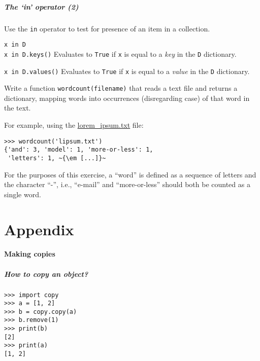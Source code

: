 \documentclass[english,serif,mathserif,xcolor=pdftex,dvipsnames,table]{beamer}
\begin{document}
\begin{frame}[fragile]
  \frametitle{The `{\ttfamily\bfseries in}' operator (2)}

  Use the \lstinline|in| operator to test for presence of an item in a
  collection.

  \begin{describe}{\lstinline|x in D| \\ \lstinline|x in D.keys()|}
    Evaluates to \texttt{True} if \lstinline|x| is equal to a \emph{key}
    in the \lstinline|D| dictionary.
  \end{describe}

  \begin{describe}{\lstinline|x in D.values()|}
    Evaluates to \texttt{True} if \lstinline|x| is equal to a \emph{value}
    in the \lstinline|D| dictionary.
  \end{describe}

\end{frame}


\begin{frame}[fragile]
\begin{exercise*}[6.A]
    Write a function \lstinline|wordcount(filename)| that reads a text
    file and returns a dictionary, mapping words into occurrences
    (disregarding case) of that word in the text.

    \+ For example, using the
    \href{https://raw.github.com/gc3-uzh-ch/python-course/master/lorem_ipsum.txt}{lorem\_ipsum.txt}
    file:
    \begin{lstlisting}
>>> wordcount('lipsum.txt')
{'and': 3, 'model': 1, 'more-or-less': 1,
 'letters': 1, ~{\em [...]}~
    \end{lstlisting}

    \+ For the purposes of this
    exercise, a ``word'' is defined as a sequence of letters and the
    character ``-'', i.e., ``e-mail'' and ``more-or-less'' should both
    be counted as a single word.
  \end{exercise*}
\end{frame}


\part{Appendix}


\subsection{Making copies}

\begin{frame}[fragile]
  \frametitle{How to copy an object?}
  \begin{lstlisting}
>>> import copy
>>> a = [1, 2]
>>> b = copy.copy(a)
>>> b.remove(1)
>>> print(b)
[2]
>>> print(a)
[1, 2]
  \end{lstlisting}
\end{frame}
\end{document}
